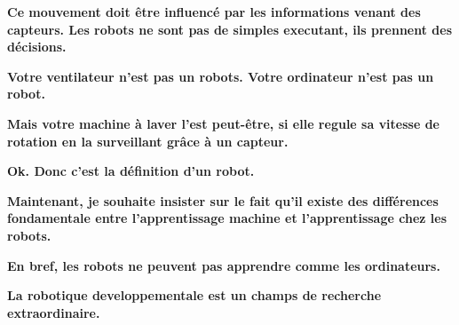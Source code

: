 \documentclass{beamer}
\begin{document}
\begin{frame}
\begin{center}
\textbf{Ce mouvement doit être influencé par les informations venant des capteurs. Les robots ne sont pas de simples executant, ils prennent des décisions.
}
\let\thefootnote\relax{}
\end{center}
\end{frame}

\begin{frame}
\begin{center}
\textbf{Votre ventilateur n'est pas un robots. Votre ordinateur n'est pas un robot.
}
\let\thefootnote\relax{}
\end{center}
\end{frame}

\begin{frame}
\begin{center}
\textbf{Mais votre machine à laver l'est peut-être, si elle regule sa vitesse de rotation en la surveillant grâce à un capteur.
}
\let\thefootnote\relax{}
\end{center}
\end{frame}

\begin{frame}
\begin{center}
\textbf{Ok. Donc c'est la définition d'un robot.
}
\let\thefootnote\relax{}
\end{center}
\end{frame}

\begin{frame}
\begin{center}
\textbf{Maintenant, je souhaite insister sur le fait qu'il existe des différences fondamentale entre l'apprentissage machine et l'apprentissage chez les robots.
}
\let\thefootnote\relax{}
\end{center}
\end{frame}

\begin{frame}
\begin{center}
\textbf{En bref, les robots ne peuvent pas apprendre comme les ordinateurs.
}
\let\thefootnote\relax{}
\end{center}
\end{frame}

\begin{frame}
\begin{center}
\textbf{La robotique developpementale est un champs de recherche extraordinaire.
}
\let\thefootnote\relax{}
\end{center}
\end{frame}
\end{document}
